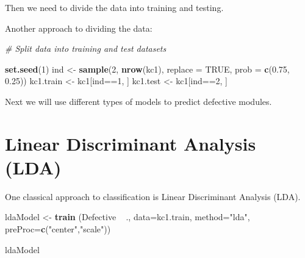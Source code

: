 \documentclass[]{book}
\newenvironment{Shaded}{\begin{snugshade}}{\end{snugshade}}
\newcommand{\KeywordTok}[1]{\textcolor[rgb]{0.13,0.29,0.53}{\textbf{{#1}}}}
\newcommand{\DataTypeTok}[1]{\textcolor[rgb]{0.13,0.29,0.53}{{#1}}}
\newcommand{\DecValTok}[1]{\textcolor[rgb]{0.00,0.00,0.81}{{#1}}}
\newcommand{\FloatTok}[1]{\textcolor[rgb]{0.00,0.00,0.81}{{#1}}}
\newcommand{\StringTok}[1]{\textcolor[rgb]{0.31,0.60,0.02}{{#1}}}
\newcommand{\CommentTok}[1]{\textcolor[rgb]{0.56,0.35,0.01}{\textit{{#1}}}}
\newcommand{\OtherTok}[1]{\textcolor[rgb]{0.56,0.35,0.01}{{#1}}}
\newcommand{\NormalTok}[1]{{#1}}
\begin{document}
Then we need to divide the data into training and testing.

\begin{Shaded}
\end{Shaded}

Another approach to dividing the data:

\begin{Shaded}
\begin{Highlighting}[]
\CommentTok{# Split data into training and test datasets}

\KeywordTok{set.seed}\NormalTok{(}\DecValTok{1}\NormalTok{)}
\NormalTok{ind <-}\StringTok{ }\KeywordTok{sample}\NormalTok{(}\DecValTok{2}\NormalTok{, }\KeywordTok{nrow}\NormalTok{(kc1), }\DataTypeTok{replace =} \OtherTok{TRUE}\NormalTok{, }\DataTypeTok{prob =} \KeywordTok{c}\NormalTok{(}\FloatTok{0.75}\NormalTok{, }\FloatTok{0.25}\NormalTok{))}
\NormalTok{kc1.train <-}\StringTok{ }\NormalTok{kc1[ind==}\DecValTok{1}\NormalTok{, ]}
\NormalTok{kc1.test <-}\StringTok{ }\NormalTok{kc1[ind==}\DecValTok{2}\NormalTok{, ]}
\end{Highlighting}
\end{Shaded}

Next we will use different types of models to predict defective modules.

\section{Linear Discriminant Analysis
(LDA)}\label{linear-discriminant-analysis-lda}

One classical approach to classification is Linear Discriminant Analysis
(LDA).

\begin{Shaded}
\begin{Highlighting}[]
\NormalTok{ldaModel <-}\StringTok{ }\KeywordTok{train} \NormalTok{(Defective ~}\StringTok{ }\NormalTok{., }\DataTypeTok{data=}\NormalTok{kc1.train, }\DataTypeTok{method=}\StringTok{"lda"}\NormalTok{, }\DataTypeTok{preProc=}\KeywordTok{c}\NormalTok{(}\StringTok{"center"}\NormalTok{,}\StringTok{"scale"}\NormalTok{))}

\NormalTok{ldaModel}
\end{Highlighting}
\end{Shaded}
\end{document}
